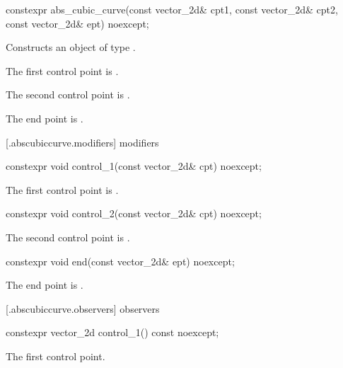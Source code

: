 %
\begin{itemdecl}
constexpr abs_cubic_curve(const vector_2d& cpt1, const vector_2d& cpt2,
  const vector_2d& ept) noexcept;
\end{itemdecl}
\begin{itemdescr}
\pnum
\effects
Constructs an object of type .

\pnum
The first control point is .

\pnum
The second control point is .

\pnum
The end point is .
\end{itemdescr}

 [\iotwod.abscubiccurve.modifiers]{ modifiers}

%
\begin{itemdecl}
constexpr void control_1(const vector_2d& cpt) noexcept;
\end{itemdecl}
\begin{itemdescr}
\pnum
\effects
The first control point is .
\end{itemdescr}

%
\begin{itemdecl}
constexpr void control_2(const vector_2d& cpt) noexcept;
\end{itemdecl}
\begin{itemdescr}
\pnum
\effects
The second control point is .
\end{itemdescr}

%
\begin{itemdecl}
constexpr void end(const vector_2d& ept) noexcept;
\end{itemdecl}
\begin{itemdescr}
\pnum
\effects
The end point is .
\end{itemdescr}

 [\iotwod.abscubiccurve.observers]{ observers}

%
\begin{itemdecl}
constexpr vector_2d control_1() const noexcept;
\end{itemdecl}
\begin{itemdescr}
\pnum
\returns
The first control point.
\end{itemdescr}

